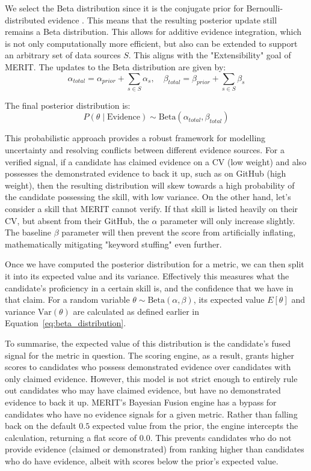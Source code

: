 We select the Beta distribution since it is the conjugate prior for Bernoulli-distributed evidence \cite{gelman2013bayesian}. This means that the resulting posterior
update still remains a Beta distribution. This allows for additive evidence integration, which is not only computationally more efficient,
but also can be extended to support an arbitrary set of data sources $S$. This aligns with the "Extensibility" goal of MERIT. The updates to the Beta
distribution are given by:
\begin{equation}
  \alpha_{total} = \alpha_{prior} + \sum_{s \in S} \alpha_s, \quad \beta_{total} = \beta_{prior} + \sum_{s \in S} \beta_s
\end{equation}

The final posterior distribution is:
\begin{equation}
  P(\theta \mid \text{Evidence}) \sim \text{Beta}(\alpha_{total}, \beta_{total})
\end{equation}

This probabilistic approach provides a robust framework for modelling uncertainty and resolving conflicts between
different evidence sources. For a verified signal, if a candidate has claimed evidence on a CV (low weight) and also
possesses the demonstrated evidence to back it up, such as on GitHub (high weight), then the resulting distribution will
skew towards a high probability of the candidate possessing the skill, with low variance. On the other hand, let's consider a skill 
that MERIT cannot verify. If that skill is listed heavily on their CV, but absent from their GitHub, the $\alpha$ parameter will only 
increase slightly. The baseline $\beta$ parameter will then prevent the score from artificially inflating, mathematically mitigating 
"keyword stuffing" even further.

Once we have computed the posterior distribution for a metric, we can then split it into its expected value and its variance. Effectively
this measures what the candidate's proficiency in a certain skill is, and the confidence that we have in that claim. For a random variable
$\theta \sim \text{Beta}(\alpha, \beta)$, its expected value $E[\theta]$ and variance $\text{Var}(\theta)$ are calculated as defined earlier in Equation~\ref{eq:beta_distribution}.

To summarise, the expected value of this distribution is the candidate's fused signal for the metric in question.
The scoring engine, as a result, grants higher scores to candidates who possess demonstrated evidence over candidates with only claimed evidence. 
However, this model is not strict enough to entirely rule out candidates who may have claimed evidence, but have no demonstrated evidence to back it up.
MERIT's Bayesian Fusion engine has a bypass for candidates who have no evidence signals for a given metric. Rather than falling back on the default $0.5$ expected
value from the prior, the engine intercepts the calculation, returning a flat score of $0.0$. This prevents candidates who do not provide evidence (claimed or demonstrated)
from ranking higher than candidates who do have evidence, albeit with scores below the prior's expected value.

